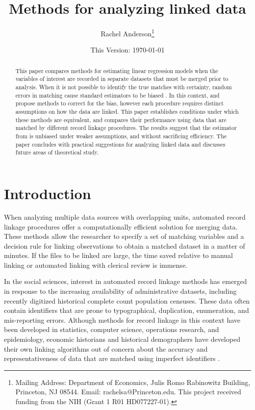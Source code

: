 \documentclass[12pt]{article}
\title{\singlespacing Methods for analyzing linked data}
\author{Rachel Anderson\thanks{Mailing Address: Department of Economics, Julis Romo Rabinowitz Building,
Princeton, NJ 08544. Email: rachelsa@Princeton.edu.
This project received funding from the NIH (Grant 1 R01 HD077227-01). }}
\date{This Version: \today}
\begin{document}
\maketitle

\begin{abstract}
\singlespacing
\noindent This paper compares methods for estimating linear regression models when the variables of interest are recorded in separate datasets that must be merged prior to analysis.  When it is not possible to identify the true matches with certainty, random errors in matching cause standard estimators to be biased \citep*{NeterMaynes}.  
In this context, \cite{sw1993} and \cite*{ahl2019} propose methods to correct for the bias, however each procedure requires distinct assumptions on how the data are linked.  This paper establishes conditions under which these methods are equivalent, and compares their performance using data that are matched by different record linkage procedures.  The results suggest that the estimator from \citet*{ahl2019} is unbiased under weaker assumptions, and without sacrificing efficiency.  The paper concludes with practical suggestions for analyzing linked data and discusses future areas of theoretical study. \end{abstract}
\newpage

\section{Introduction}

When analyzing multiple data sources with overlapping units, automated record linkage procedures offer a computationally efficient solution for merging data.  These methods allow the researcher to specify a set of matching variables and a decision rule for linking observations to obtain a matched dataset in a matter of minutes.  If the files to be linked are large, the time saved relative to manual linking or automated linking with clerical review is immense. 

In the social sciences, interest in automated record linkage methods has emerged in response to the increasing availability of administrative datasets, including recently digitized historical complete count population censuses.  These data often contain identifiers that are prone to typographical, duplication, enumeration, and mis-reporting errors.  Although methods for record linkage in this context have been developed in statistics, computer science, operations research, and epidemiology, economic historians and historical demographers have developed their own linking algorithms out of concern about the accuracy and representativeness of data that are matched using imperfect identifiers \citep*{ferrie96, abe2012, abe2014, abe2019b}.
\end{document}
